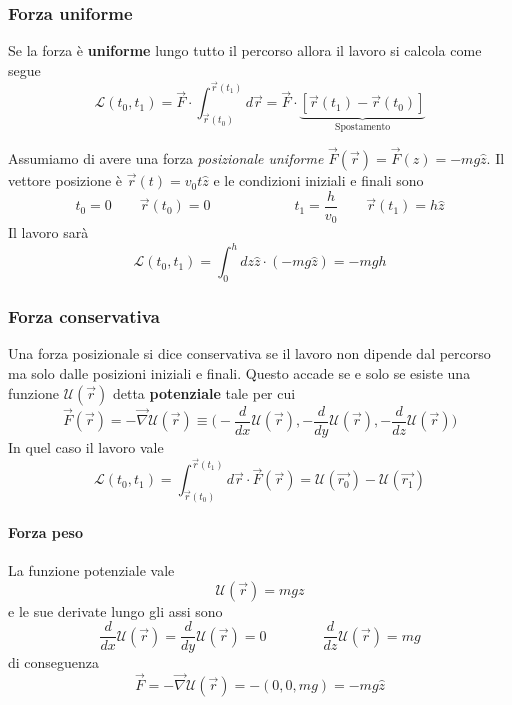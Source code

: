 \subsubsection{Forza uniforme}
Se la forza è \textbf{uniforme} lungo tutto il percorso allora il lavoro si calcola come segue
\begin{equation}
	\mathcal{L}(t_0, t_1) = \vec{F} \cdot \int_{\vec{r}(t_0)}^{\vec{r}(t_1)} d\vec{r}= \vec{F} \cdot \underbrace{[\vec{r}(t_1) - \vec{r}(t_0)]}_{\text{Spostamento}}
\end{equation}

\begin{example}
	Assumiamo di avere una forza \textit{posizionale uniforme} $\vec{F}(\vec{r}) = \vec{F}(z) = -mg\widehat{z}$. Il vettore posizione è $\vec{r}(t) = v_0 t \widehat{z}$ e le condizioni iniziali e finali sono
	\begin{equation*}
		t_0 = 0 \qquad \vec{r}(t_0) = 0 \qquad\qquad\qquad t_1 = \frac{h}{v_0} \qquad \vec{r}(t_1) = h \widehat{z}
	\end{equation*}
	Il lavoro sarà
	\begin{equation*}
		\mathcal{L}(t_0, t_1) = \int_{0}^{h} dz\widehat{z}\cdot (-mg\widehat{z}) = -mgh
	\end{equation*}
\end{example}

\subsubsection{Forza conservativa}
Una forza posizionale si dice conservativa se il lavoro non dipende dal percorso ma solo dalle posizioni iniziali e finali. Questo accade se e solo se esiste una funzione $\mathcal{U}(\vec{r})$ detta \textbf{potenziale} tale per cui
\begin{equation}
	\vec{F}(\vec{r}) = -\vec{\nabla}\mathcal{U}(\vec{r}) \equiv \bigg(-\frac{d}{dx}\mathcal{U}(\vec{r}), -\frac{d}{dy}\mathcal{U}(\vec{r}), -\frac{d}{dz}\mathcal{U}(\vec{r})\bigg)
\end{equation}
In quel caso il lavoro vale
\begin{equation}
	\label{eq:fcons}
	\mathcal{L}(t_0, t_1) = \int_{\vec{r}(t_0)}^{\vec{r}(t_1)}d\vec{r} \cdot \vec{F}(\vec{r}) = \mathcal{U}(\vec{r_0}) - \mathcal{U}(\vec{r_1})
\end{equation}
\paragraph{Forza peso} La funzione potenziale vale
\begin{equation}
	\mathcal{U}(\vec{r}) = mgz
\end{equation}
e le sue derivate lungo gli assi sono
\begin{equation*}
	\frac{d}{dx}\mathcal{U}(\vec{r}) =\frac{d}{dy}\mathcal{U}(\vec{r}) = 0 \qquad\qquad \frac{d}{dz}\mathcal{U}(\vec{r}) = mg
\end{equation*}
di conseguenza
\begin{equation*}
	\vec{F}= -\vec{\nabla}\mathcal{U}(\vec{r}) = -(0,0,mg) = -mg\widehat{z}
\end{equation*}

